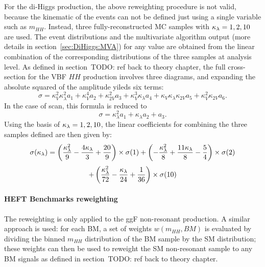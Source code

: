 For the \VBFH di-Higgs production, the above reweighting procedure is not valid, 
because the kinematic of the events can not be defined 
just using a single variable such as $m_{HH}$. 
Instead, three fully-reconstructed MC samples with $\kappa_{\lambda} = 1,2,10$ are used.
The event distributions and the multivariate algorithm output 
(more details in section~\ref{sec:DiHiggs:MVA}) 
for any \kl value are obtained from the linear combination 
of the corresponding distributions 
of the three samples at analysis level. 
As defined in section~TODO: ref back to theory chapter,
the full cross-section for the VBF $HH$ production involves 
three diagrams, and expanding the absolute squared of
the amplitude yileds six terms:
\[
\sigma = \kappa^2_V \kappa^2_\lambda a_1 + \kappa_V^4 a_2
+ \kappa_{2V}^2 a_3 + \kappa_V^3 \kappa_\lambda a_4
+ \kappa_V\kappa_\lambda\kappa_{2V} a_5 
+ \kappa_V^2 \kappa_{2V}a_6 . \]
In the case of \kl scan, this formula is reduced to 
\[
\sigma = \kappa^2_\lambda a_1 + \kappa_\lambda a_2 + a_3 .
\]
Using the basis of 
$\kappa_{\lambda} = 1,2,10$,
the linear coefficients for combining the 
three samples defined are then given by:
\begin{eqnarray*}
    \sigma (\kappa_{\lambda}) =\left(\frac{\kappa_{\lambda}^{2}}{9} - \frac{4\kappa_{\lambda}}{3} + \frac{20}{9} \right) \times \sigma (1) + \left(-\frac{\kappa_{\lambda}^{2}}{8} + \frac{11\kappa_{\lambda}}{8} - \frac{5}{4} \right) \times \sigma (2)
\end{eqnarray*}
\begin{eqnarray}
      + \left(\frac{\kappa_{\lambda}^{2}}{72} - \frac{\kappa_{\lambda}}{24} + \frac{1}{36} \right) \times \sigma (10) 
    \label{eqn:vbf-linear-comb}
\end{eqnarray}
 
\paragraph{HEFT Benchmarks reweighting}
The reweighting is only applied to the ggF non-resonant production. 
A similar approach is used: for each BM, a set of weights $w(m_{HH},BM)$ is evaluated 
by dividing the binned $m_{HH}$ distribution of the BM sample by the SM distribution;
these weights can then be used to 
reweight the SM non-resonant sample to any BM signals as 
defined in section~TODO: ref back to theory chapter. 

